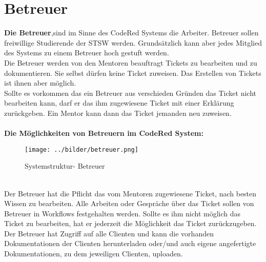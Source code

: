 \chapter{Betreuer}  %
\label{chapter:Betreuer}  %

\textbf{Die Betreuer},sind im Sinne des CodeRed Systems die Arbeiter. Betreuer sollen freiwillige Studierende der STSW werden. Grundsätzlich kann aber jedes Mitglied des Systems zu einem Betreuer hoch gestuft werden.\\
Die Betreuer werden von den Mentoren beauftragt Tickets zu bearbeiten und zu dokumentieren. Sie selbst dürfen keine Ticket zuweisen. Das Erstellen von Tickets ist ihnen aber möglich. \\
Sollte es vorkommen das ein Betreuer aus verschieden Gründen das Ticket nicht bearbeiten kann, darf er das ihm zugewiesene Ticket mit einer Erklärung zurückgeben. Ein Mentor kann dann das Ticket jemanden neu zuweisen. 
\\
\\
\textbf{Die Möglichkeiten von Betreuern im CodeRed System:}
\begin{figure}[h]
\begin{center}
   \texttt{[image: ../bilder/betreuer.png]}
   \caption{Systemstruktur- Betreuer}
   \label{Systemstruktur - Betreuer}
\end{center}
\end{figure}
\\
Der Betreuer hat die Pflicht das vom Mentoren zugewiesene Ticket, nach besten Wissen zu bearbeiten. Alle Arbeiten oder Gespräche über das Ticket sollen von Betreuer in Workflows festgehalten werden. Sollte es ihm nicht möglich das Ticket zu bearbeiten, hat er jederzeit die Möglichkeit das Ticket zurückzugeben. Der Betreuer hat Zugriff auf alle Clienten und kann die vorhanden Dokumentationen der Clienten herunterladen oder/und auch eigene angefertigte Dokumentationen, zu dem jeweiligen Clienten, uploaden.

